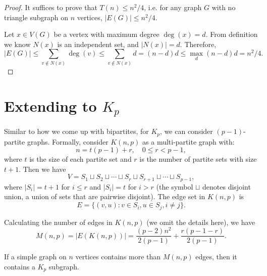 \begin{proof}
	It suffices to prove that $T(n) \le n^2/4$, i.e. for any graph $G$ with no triangle subgraph on $n$ vertices, $|E(G)|\le n^2/4$.

	Let $x\in V(G)$ be a vertex with maximum degree $\deg(x) = d$. From definition we know $N(x)$ is an independent set, and $|N(x)| = d$.
	Therefore,
	\[
		|E(G)| \le \sum_{v\not\in N(x)} \deg(v) \le \sum_{v\not\in N(x)} d = (n-d)d \le \max_d (n-d)d = n^2/4.
	\]
\end{proof}

\section{Extending to $K_p$}

Similar to how we come up with bipartites, for $K_p$, we can consider $(p-1)$-partite graphs.
Formally, consider $K(n,p)$ as a multi-partite graph with:
\[ n = t(p-1)+r, \quad 0\le r < p-1, \]
where $t$ is the size of each partite set and $r$ is the number of partite sets with size $t+1$. Then we have
\[ V = S_1\sqcup S_2\sqcup \cdots \sqcup S_r \sqcup S_{r+1}\sqcup \cdots \sqcup S_{p-1}, \]
where $|S_i| = t+1$ for $i\le r$ and $|S_i| = t$ for $i>r$ (the symbol $\sqcup$ denotes disjoint union, a union of sets that are pairwise disjoint).
The edge set in $K(n,p)$ is
\[ E = \{(v,u): v\in S_i, u\in S_j, i\neq j\}.\]

Calculating the number of edges in $K(n,p)$ (we omit the details here), we have
\[ M(n,p) = |E(K(n,p))| = \frac{(p-2)n^2}{2(p-1)} + \frac{r(p-1-r)}{2(p-1)}. \]

\begin{theorem}
	If a simple graph on $n$ vertices contains more than $M(n,p)$ edges, then it contains a $K_p$ subgraph.
\end{theorem}
